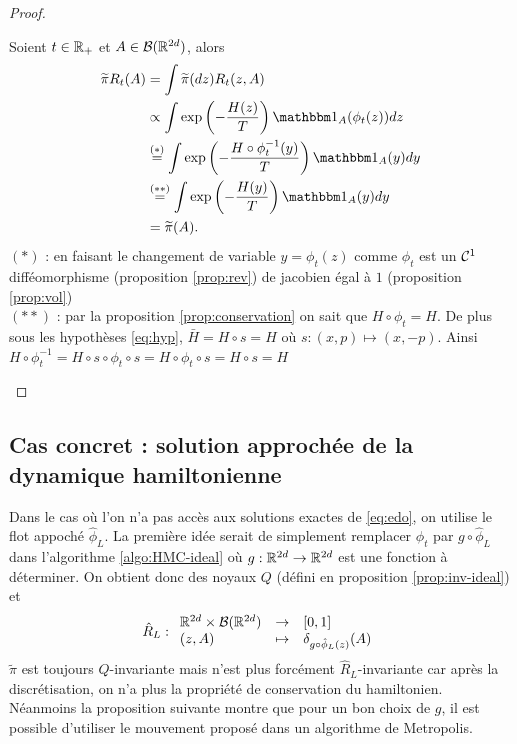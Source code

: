 \documentclass[10pt,a4paper]{article}
\begin{document}
\begin{proof}
\begin{enumerate}
		Soient $t \in \mathbb{R}_+$ et $A \in \mathcal{B}(\mathbb{R}^{2d})$, alors
		\begin{align*}
		\widetilde{\pi} R_t (A)
		&= \int \widetilde{\pi}(dz) R_t(z, A) \\
		&\propto \int \exp \left(-\frac{H(z)}{T} \right) \ind_A(\phi_t(z)) dz\\
		&\overset{(*)}{=} \int \exp \left(-\frac{H \circ \phi_t^{-1}(y)}{T} \right) \ind_A(y) dy \\
		&\overset{(**)}{=} \int \exp \left(-\frac{H(y)}{T} \right) \ind_A(y) dy \\
		&= \widetilde{\pi}(A).
		\end{align*}
		$(*)$ : en faisant le changement de variable $y = \phi_t(z)$ comme $\phi_t$ est un $\mathcal{C}^1$ difféomorphisme (proposition \ref{prop:rev}) de jacobien égal à $1$ (proposition \ref{prop:vol}) \\
		$(**)$ : par la proposition \ref{prop:conservation} on sait que $H \circ \phi_t = H$. De plus sous les hypothèses \eqref{eq:hyp}, $\bar{H} = H \circ s = H$ où $s : (x,p) \mapsto (x, -p)$. Ainsi $H \circ \phi_t^{-1} = H \circ s \circ \phi_t \circ s = H \circ \phi_t \circ s = H \circ s = H$ 
	\end{enumerate}
\end{proof}


\subsection{Cas concret : solution approchée de la dynamique hamiltonienne}
Dans le cas où l'on n'a pas accès aux solutions exactes de \eqref{eq:edo}, on utilise le flot appoché $\hat{\phi}_L$. La première idée serait de simplement remplacer $\phi_t$ par $g \circ \hat{\phi}_L$ dans l'algorithme \ref{algo:HMC-ideal} où $g : \mathbb{R}^{2d} \to \mathbb{R}^{2d}$ est une fonction à déterminer. On obtient donc des noyaux $Q$ (défini en proposition \ref{prop:inv-ideal}) et
$$
\hat{R}_L : { \begin{array}{lcl} 
  \mathbb{R}^{2d} \times \mathcal{B}(\mathbb{R}^{2d}) & \to & [0,1] \\
  (z, A) & \mapsto & \delta_{g \circ \hat{\phi}_L(z)}(A)
 \end{array} }
$$
$\widetilde{\pi}$ est toujours $Q$-invariante mais n'est plus forcément $\hat{R}_L$-invariante car après la discrétisation, on n'a plus la propriété de conservation du hamiltonien. Néanmoins la proposition suivante montre que pour un bon choix de $g$, il est possible d'utiliser le mouvement proposé dans un algorithme de Metropolis.
\end{document}
